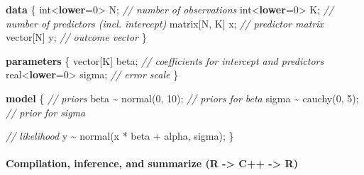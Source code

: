 \documentclass[
  11pt,
]{article}
\newenvironment{Shaded}{\begin{snugshade}}{\end{snugshade}}
\newcommand{\CommentTok}[1]{\textcolor[rgb]{0.56,0.35,0.01}{\textit{#1}}}
\newcommand{\DataTypeTok}[1]{\textcolor[rgb]{0.13,0.29,0.53}{#1}}
\newcommand{\DecValTok}[1]{\textcolor[rgb]{0.00,0.00,0.81}{#1}}
\newcommand{\KeywordTok}[1]{\textcolor[rgb]{0.13,0.29,0.53}{\textbf{#1}}}
\newcommand{\NormalTok}[1]{#1}
\begin{document}
\begin{Shaded}
\begin{Highlighting}[]
\KeywordTok{data}\NormalTok{ \{}
  \DataTypeTok{int}\NormalTok{\textless{}}\KeywordTok{lower}\NormalTok{=}\DecValTok{0}\NormalTok{\textgreater{} N;   }\CommentTok{// number of observations}
  \DataTypeTok{int}\NormalTok{\textless{}}\KeywordTok{lower}\NormalTok{=}\DecValTok{0}\NormalTok{\textgreater{} K;   }\CommentTok{// number of predictors (incl. intercept)}
  \DataTypeTok{matrix}\NormalTok{[N, K] x;   }\CommentTok{// predictor matrix}
  \DataTypeTok{vector}\NormalTok{[N] y;      }\CommentTok{// outcome vector}
\NormalTok{\}}

\KeywordTok{parameters}\NormalTok{ \{}
  \DataTypeTok{vector}\NormalTok{[K] beta;       }\CommentTok{// coefficients for intercept and predictors}
  \DataTypeTok{real}\NormalTok{\textless{}}\KeywordTok{lower}\NormalTok{=}\DecValTok{0}\NormalTok{\textgreater{} sigma;  }\CommentTok{// error scale}
\NormalTok{\}}

\KeywordTok{model}\NormalTok{ \{}
 \CommentTok{// priors}
\NormalTok{  beta \textasciitilde{} normal(}\DecValTok{0}\NormalTok{, }\DecValTok{10}\NormalTok{);  }\CommentTok{// priors for beta}
\NormalTok{  sigma \textasciitilde{} cauchy(}\DecValTok{0}\NormalTok{, }\DecValTok{5}\NormalTok{);  }\CommentTok{// prior for sigma}

  \CommentTok{// likelihood}
\NormalTok{  y \textasciitilde{} normal(x * beta + alpha, sigma);}
\NormalTok{\}}
\end{Highlighting}
\end{Shaded}

\hypertarget{compilation-inference-and-summarize-r---c---r}{%
\paragraph{Compilation, inference, and summarize (R -\textgreater{} C++ -\textgreater{} R)}\label{compilation-inference-and-summarize-r---c---r}}
\end{document}

